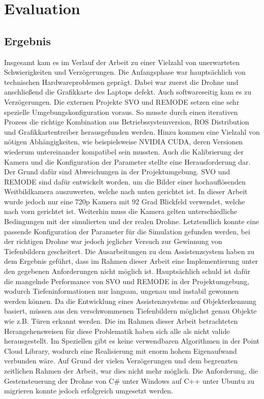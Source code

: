\chapter{Evaluation}
\section{Ergebnis}
Insgesamt kam es im Verlauf der Arbeit zu einer Vielzahl von unerwarteten Schwierigkeiten und Verzögerungen. Die Anfangsphase war hauptsächlich von technischen Hardwareproblemen geprägt. Dabei war zuerst die Drohne und anschließend die Grafikkarte des Laptops defekt. \newline
Auch softwareseitig kam es zu Verzögerungen. Die externen Projekte SVO und REMODE setzen eine sehr spezielle Umgebungskonfiguration voraus. So musste durch einen iterativen Prozess die richtige Kombination aus Betriebssystemversion, ROS Distribution und Grafikkartentreiber herausgefunden werden. Hinzu kommen eine Vielzahl von nötigen Abhängigkeiten, wie beispielsweise NVIDIA CUDA, deren Versionen wiederum untereinander kompatibel sein mussten.  \newline
Auch die Kalibrierung der Kamera und die Konfiguration der Parameter stellte eine Herausforderung dar. Der Grund dafür sind Abweichungen in der Projektumgebung. SVO und REMODE sind dafür entwickelt worden, um die Bilder einer hochauflösenden Weitbildkamera auszuwerten, welche nach unten gerichtet ist. In dieser Arbeit wurde jedoch nur eine 720p Kamera mit 92 Grad Blickfeld verwendet, welche nach vorn gerichtet ist. Weiterhin muss die Kamera gelten unterschiedliche Bedingungen mit der simulierten und der realen Drohne. \newline
Letztendlich konnte eine passende Konfiguration der Parameter für die Simulation gefunden werden, bei der richtigen Drohne war jedoch jeglicher Versuch zur Gewinnung von Tiefenbildern gescheitert. \newline
Die Ausarbeitungen zu dem Assistenzsystem haben zu dem Ergebnis geführt, dass im Rahmen dieser Arbeit eine Implementierung unter den gegebenen Anforderungen nicht möglich ist. Hauptsächlich schuld ist dafür die mangelnde Performance von SVO und REMODE in der Projektumgebung, wodurch Tiefeninformationen nur langsam, ungenau und instabil gewonnen werden können. Da die Entwicklung eines Assistenzsystems auf Objekterkennung basiert, müssen aus den verschwommenen Tiefenbildern möglichst genau Objekte wie z.B. Türen erkannt werden. Die im Rahmen dieser Arbeit betrachteten Herangehensweisen für diese Problematik haben sich alle als nicht valide herausgestellt. Im Speziellen gibt es keine verwendbaren Algorithmen in der Point Cloud Library, wodurch eine Realisierung mit enorm hohem Eigenaufwand verbunden wäre. Auf Grund der vielen Verzögerungen und dem begrenzten zeitlichen Rahmen der Arbeit, war dies nicht mehr möglich.
Die Anforderung, die Gestensteuerung der Drohne von C\# unter Windows auf C++ unter Ubuntu zu migrieren konnte jedoch erfolgreich umgesetzt werden.

